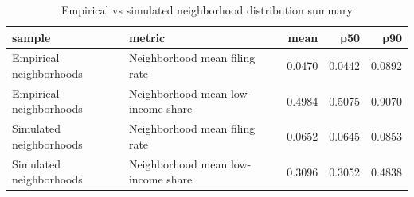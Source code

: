 \begin{table}

\caption{Empirical vs simulated neighborhood distribution summary}
\centering
\begin{tabular}[t]{llrrr}
\toprule
sample & metric & mean & p50 & p90\\
\midrule
Empirical neighborhoods & Neighborhood mean filing rate & 0.0470 & 0.0442 & 0.0892\\
Empirical neighborhoods & Neighborhood mean low-income share & 0.4984 & 0.5075 & 0.9070\\
Simulated neighborhoods & Neighborhood mean filing rate & 0.0652 & 0.0645 & 0.0853\\
Simulated neighborhoods & Neighborhood mean low-income share & 0.3096 & 0.3052 & 0.4838\\
\bottomrule
\end{tabular}
\end{table}
